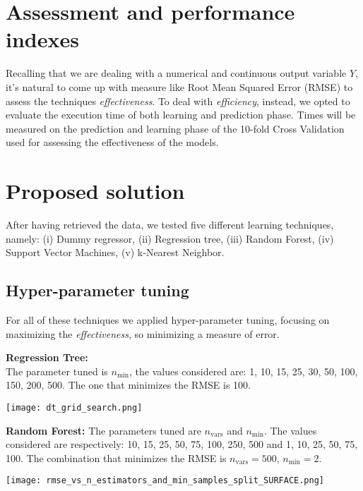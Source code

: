 \documentclass{article}
\begin{document}
\section{Assessment and performance indexes}
\label{sec:assessment_performance_index}
Recalling that we are dealing with a numerical and continuous output variable $Y$, it's natural to come up with measure like Root Mean Squared Error (RMSE) to assess the techniques \textit{effectiveness}.
To deal with \textit{efficiency}, instead, we opted to evaluate the execution time of both learning and prediction phase. Times will be measured on the prediction and learning phase of the 10-fold Cross Validation used for assessing the effectiveness of the models.


\section{Proposed solution}
\label{sec:solution}

After having retrieved the data, we tested five different learning techniques, namely: (i) Dummy regressor, (ii) Regression tree, (iii) Random Forest, (iv) Support Vector Machines, (v) k-Nearest Neighbor.

\subsection{Hyper-parameter tuning}
For all of these techniques we applied hyper-parameter tuning, focusing on maximizing the \textit{effectiveness}, so minimizing a measure of error.

\noindent
\begin{minipage}{0.5\textwidth}
    \textbf{Regression Tree:} \\
    The parameter tuned is $n_{\text{min}}$, the values considered are: 1, 10, 15, 25, 30, 50, 100, 150, 200, 500. The one that minimizes the RMSE is 100.
\end{minipage}%
\begin{minipage}{0.5\textwidth}
    \centering
    \texttt{[image: dt\_grid\_search.png]}
\end{minipage}

\noindent
\begin{minipage}{0.5\textwidth}
\textbf{Random Forest:} The parameters tuned are $n_{\text{vars}}$ and $n_{\text{min}}$. The values considered are respectively: 10, 15, 25, 50, 75, 100, 250, 500 and 1, 10, 25, 50, 75, 100. The combination that minimizes the RMSE is $n_{\text{vars}} = 500$, $n_{\text{min}} = 2$.
\end{minipage}%
\begin{minipage}{0.5\textwidth}
    \centering
    \texttt{[image: rmse\_vs\_n\_estimators\_and\_min\_samples\_split\_SURFACE.png]}
\end{minipage}
\end{document}
